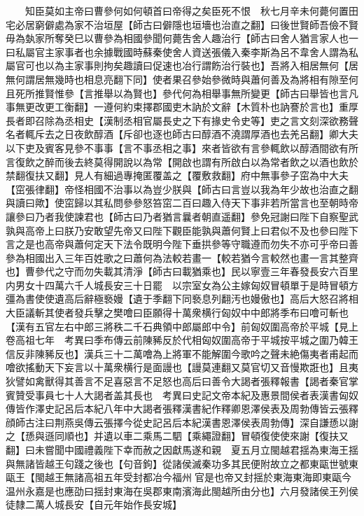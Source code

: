 　　知臣莫如主帝曰曹參何如何頓首曰帝得之矣臣死不恨　秋七月辛未何薨何置田宅必居窮僻處為家不治垣屋【師古曰僻隱也垣墻也治直之翻】曰後世賢師吾儉不賢毋為埶家所奪癸巳以曹參為相國參聞何薨吿舍人趣治行【師古曰舍人猶言家人也一曰私屬官主家事者也余據戰國時蘇秦使舍人資送張儀入秦李斯為呂不韋舍人謂為私屬官可也以為主家事則拘矣趣讀曰促速也冶行謂飭治行裝也】吾將入相居無何【居無何謂居無幾時也相息亮翻下同】使者果召參始參微時與蕭何善及為將相有隙至何且死所推賢惟參【言推舉以為賢也】參代何為相舉事無所變更【師古曰舉皆也言凡事無更改更工衡翻】一遵何約束擇郡國吏木訥於文辭【木質朴也訥謇於言也】重厚長者即召除為丞相史【漢制丞相官屬長史之下有掾史令史等】吏之言文刻深欲務聲名者輒斥去之日夜飲醇酒【斥卻也逐也師古曰醇酒不澆謂厚酒也去羌呂翻】卿大夫以下吏及賓客見參不事事【言不事丞相之事】來者皆欲有言參輒飲以醇酒間欲有所言復飲之醉而後去終莫得開說以為常【開啟也謂有所啟白以為常者飲之以酒也飲於禁翻復扶又翻】見人有細過專掩匿覆盖之【覆敷救翻】府中無事參子窋為中大夫【窋張律翻】帝怪相國不治事以為豈少朕與【師古曰言豈以我為年少故也治直之翻與讀曰歟】使窋歸以其私問參參怒笞窋二百曰趣入侍天下事非若所當言也至朝時帝讓參曰乃者我使諫君也【師古曰乃者猶言曩者朝直遥翻】參免冠謝曰陛下自察聖武孰與高帝上曰朕乃安敢望先帝又曰陛下觀臣能孰與蕭何賢上曰君似不及也參曰陛下言之是也高帝與蕭何定天下法令既明今陛下垂拱參等守職遵而勿失不亦可乎帝曰善參為相國出入三年百姓歌之曰蕭何為法較若畫一【較若猶今言較然也畫一言其整齊也】曹參代之守而勿失載其清淨【師古曰載猶乘也】民以寧壹三年春發長安六百里内男女十四萬六千人城長安三十日罷　以宗室女為公主嫁匈奴冒頓單于是時冒頓方彊為書使使遺高后辭極䙝嫚【遺于季翻下同䙝息列翻汚也嫚傲也】高后大怒召將相大臣議斬其使者發兵擊之樊噲曰臣願得十萬衆横行匈奴中中郎將季布曰噲可斬也【漢有五官左右中郎三將秩二千石典領中郎屬郎中令】前匈奴圍高帝於平城【見上卷高祖七年　考異曰季布傳云前陳豨反於代相匈奴圍高帝于平城按平城之圍乃韓王信反非陳豨反也】漢兵三十二萬噲為上將軍不能解圍今歌吟之聲未絶傷夷者甫起而噲欲搖動天下妄言以十萬衆横行是面謾也【謾莫連翻又莫官切又音慢欺誑也】且夷狄譬如禽獸得其善言不足喜惡言不足怒也高后曰善令大謁者張釋報書【謁者秦官掌賓贊受事員七十人大謁者盖其長也　考異曰史記文帝本紀及惠景間侯者表漢書匈奴傳皆作澤史記呂后本紀八年中大謁者張釋漢書紀作釋卿恩澤侯表及周勃傳皆云張釋顔師古注曰荆燕吳傳云張擇今從史記呂后本紀漢書恩澤侯表周勃傳】深自謙愻以謝之【愻與遜同順也】并遺以車二乘馬二駟【乘繩證翻】冒頓復使使來謝【復扶又翻】曰未嘗聞中國禮義陛下幸而赦之因獻馬遂和親　夏五月立閩越君揺為東海王揺與無諸皆越王句踐之後也【句音鉤】從諸侯滅秦功多其民便附故立之都東甌世號東甌王【閩越王無諸高祖五年受封都冶今福州官是也帝又封揺於東海東海即東甌今温州永嘉是也應劭曰揺封東海在吳郡東南濱海此閩越所由分也】六月發諸侯王列侯徒隸二萬人城長安【自元年始作長安城】

